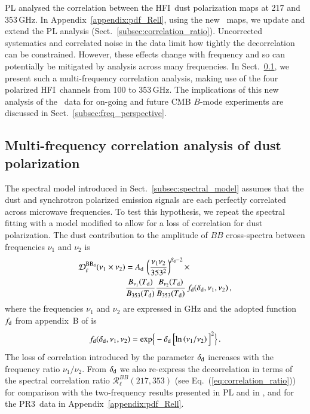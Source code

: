 \documentclass[longauth,traditabstract]{aa}
\newcommand{\HFI}{HFI}
\newcommand{\PR}{PR3}
\begin{document}
PL analysed the correlation between the \HFI\ dust polarization maps at 217 and 353\,GHz.  
In Appendix~\ref{appendix:pdf_Rell}, using the new \Planck\ maps, we update and extend the PL analysis (Sect.~\ref{subsec:correlation_ratio}).  
Uncorrected systematics and correlated noise in the data limit how tightly the decorrelation can be constrained.
%
However, these effects change with frequency and so can potentially be mitigated by analysis across many frequencies.
In Sect.~\ref{subsec:multi_freq_deco}, we present such a multi-frequency correlation analysis, making use of the four polarized \HFI\ channels from 100 to 353\,GHz.
The implications of this new analysis of the \Planck\ data for on-going and future CMB $B$-mode experiments are discussed in Sect.~\ref{subsec:freq_perspective}. 

\subsection{Multi-frequency correlation analysis of dust polarization}
\label{subsec:multi_freq_deco}

The spectral model introduced in Sect.~\ref{subsec:spectral_model} assumes that the dust and synchrotron polarized emission signals are each perfectly correlated across microwave frequencies.
To test this hypothesis, we repeat the spectral fitting with a model modified to allow for a loss of correlation for dust polarization. 
The dust contribution to the amplitude of $BB$ cross-spectra between frequencies $\nu_1$ and $\nu_2$ is
%
\begin{align}
\label{eq:dust_decorrelation}
{\cal D}_\ell^{\rm BB_d} (\nu_1 \times \nu_2) & = 
 A_{\rm d} \, \left(\frac{\nu_1 \nu_2}{353^2} \right)^{\beta_{\rm d}-2} \times  \nonumber \\
& \frac{B_{\nu_1}(T_{\rm d})}{B_{353}(T_{\rm d})}  \frac{B_{\nu_2}(T_{\rm d})}{B_{353}(T_{\rm d})} \, f_{\rm d}(\delta_{\rm d},\nu_1,\nu_2) \, ,
\end{align}
%
where the frequencies $\nu_1$ and $\nu_2$ are expressed in GHz and the adopted function $f_{\rm d}$ from appendix~B of \citet{Vansyngel16} is 
%
\begin{equation}
f_{\rm d}(\delta_{\rm d},\nu_1,\nu_2) =  {\rm exp}\Big\{- \delta_{\rm d} \, \Big[{\rm ln} \left(\nu_1/\nu_2\right)\Big]^2 \Big\} \, .
\label{eq:decorrelation}
\end{equation} 
%
The loss of correlation introduced by the parameter $\delta_{\rm d}$ increases with the frequency ratio ${\nu_1}/{\nu_2}$. 
From $\delta_{\rm d}$ we also re-express the decorrelation in terms of the spectral correlation ratio $\mathcal{R}_{\ell}^{BB}(217, 353)$ (see Eq.~(\ref{eq:correlation_ratio}))
for comparison with the two-frequency results presented in 
PL and in \citet{Sheehy17}, and for the \PR\ data in Appendix~\ref{appendix:pdf_Rell}.
\end{document}
